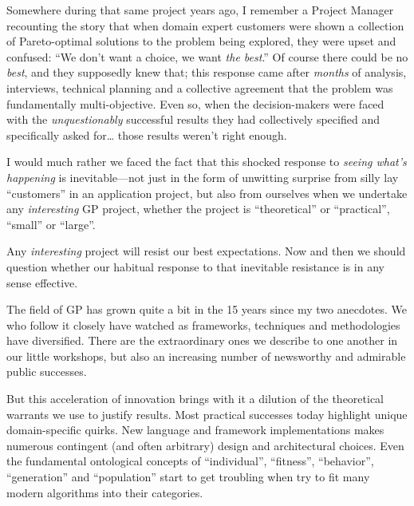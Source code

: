 Somewhere during that same project years ago, I remember a Project Manager recounting the story that when domain expert customers were shown a collection of Pareto-optimal solutions to the problem being explored, they were upset and confused: ``We don't want a choice, we want \emph{the best}.'' Of course there could be no \emph{best}, and they supposedly knew that; this response came after \emph{months} of analysis, interviews, technical planning and a collective agreement that the problem was fundamentally multi-objective. Even so, when the decision-makers were faced with the \emph{unquestionably} successful results they had collectively specified and specifically asked for\ldots{} those results weren't right enough.

I would much rather we faced the fact that this shocked response to \emph{seeing what's happening} is inevitable---not just in the form of unwitting surprise from silly lay ``customers'' in an application project, but also from ourselves when we undertake any \emph{interesting} GP project, whether the project is ``theoretical'' or ``practical'', ``small'' or ``large''.

Any \emph{interesting} project will resist our best expectations. Now and then we should question whether our habitual response to that inevitable resistance is in any sense effective.

The field of GP has grown quite a bit in the 15 years since my two anecdotes. We who follow it closely have watched as frameworks, techniques and methodologies have diversified. There are the extraordinary ones we describe to one another in our little workshops, but also an increasing number of newsworthy and admirable public successes.

But this acceleration of innovation brings with it a dilution of the theoretical warrants we use to justify results. Most practical successes today highlight unique domain-specific quirks. New language and framework implementations makes numerous contingent (and often arbitrary) design and architectural choices. Even the fundamental ontological concepts of ``individual'', ``fitness'', ``behavior'', ``generation'' and ``population'' start to get troubling when try to fit many modern algorithms into their categories.

